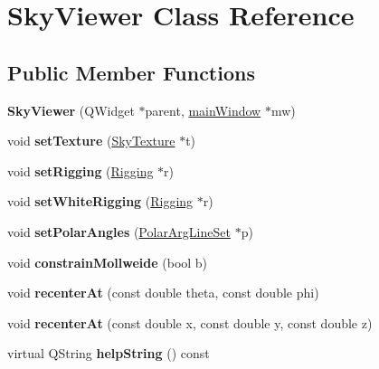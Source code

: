 \hypertarget{classSkyViewer}{
\section{SkyViewer Class Reference}
\label{classSkyViewer}
}
\subsection*{Public Member Functions}
\begin{DoxyCompactItemize}
\item 
\hypertarget{classSkyViewer_ae460c1b2f45369e8dd7fe0dcdd1cbaf0}{
{\bfseries SkyViewer} (QWidget $\ast$parent, \hyperlink{classmainWindow}{mainWindow} $\ast$mw)}
\label{classSkyViewer_ae460c1b2f45369e8dd7fe0dcdd1cbaf0}

\item 
\hypertarget{classSkyViewer_acbb349d30b42b0fb205e4e978c184f55}{
void {\bfseries setTexture} (\hyperlink{classSkyTexture}{SkyTexture} $\ast$t)}
\label{classSkyViewer_acbb349d30b42b0fb205e4e978c184f55}

\item 
\hypertarget{classSkyViewer_aee27d4ff90f31432246ddc69cfcc7e5c}{
void {\bfseries setRigging} (\hyperlink{classRigging}{Rigging} $\ast$r)}
\label{classSkyViewer_aee27d4ff90f31432246ddc69cfcc7e5c}

\item 
\hypertarget{classSkyViewer_a07d2a0244841d5462e19d20a7a213e5b}{
void {\bfseries setWhiteRigging} (\hyperlink{classRigging}{Rigging} $\ast$r)}
\label{classSkyViewer_a07d2a0244841d5462e19d20a7a213e5b}

\item 
\hypertarget{classSkyViewer_a7f86089833060da2a55bf04294344a16}{
void {\bfseries setPolarAngles} (\hyperlink{classPolarArgLineSet}{PolarArgLineSet} $\ast$p)}
\label{classSkyViewer_a7f86089833060da2a55bf04294344a16}

\item 
\hypertarget{classSkyViewer_affb1d3e5c3b58758d69be54ef5e9ac75}{
void {\bfseries constrainMollweide} (bool b)}
\label{classSkyViewer_affb1d3e5c3b58758d69be54ef5e9ac75}

\item 
\hypertarget{classSkyViewer_a2141c313ebfad3b82325e6724f00eb94}{
void {\bfseries recenterAt} (const double theta, const double phi)}
\label{classSkyViewer_a2141c313ebfad3b82325e6724f00eb94}

\item 
\hypertarget{classSkyViewer_aefde4ebbf7c9e5059d52244b1ff03880}{
void {\bfseries recenterAt} (const double x, const double y, const double z)}
\label{classSkyViewer_aefde4ebbf7c9e5059d52244b1ff03880}

\item 
\hypertarget{classSkyViewer_a0993c050864033a28b88969d3e704558}{
virtual QString {\bfseries helpString} () const }
\label{classSkyViewer_a0993c050864033a28b88969d3e704558}

\end{DoxyCompactItemize}
